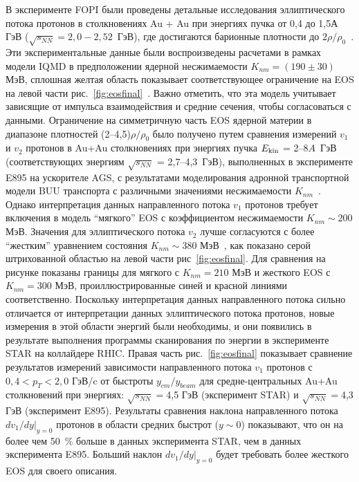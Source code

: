 В эксперименте FOPI были проведены детальные исследования эллиптического потока протонов  в столкновениях Au + Au при энергиях пучка
от 0,4 до 1,5$А$ ГэВ ($\sqrt{s_{NN}} = 2,0 - 2,52$~ГэВ), где достигаются барионные плотности до $2 \rho/\rho_0$~\cite{FOPI:2011aa}.   
Эти экспериментальные данные были воспроизведены расчетами в рамках модели IQMD в предположении ядерной несжимаемости $K_{nm} = (190 \pm 30)$ МэВ, сплошная желтая область показывает соответствующее ограничение на EOS на левой части рис.~\ref{fig:eosfinal}~\cite{sturm2001evidence}. 
Важно отметить, что эта модель учитывает зависящие от импульса взаимодействия и средние сечения, чтобы согласоваться с данными.
Ограничение на симметричную часть EOS ядерной материи  в диапазоне плотностей (2--4,5)$\rho/\rho_{0}$ было получено путем сравнения измерений $v_1$ и $v_2$ протонов в Au+Au столкновениях при энергиях пучка $E_{\rm kin}$ = 2--8$A$~ГэВ (соответствующих энергиям  $\sqrt{s_{NN}}$ = 2,7--4,3~ГэВ), выполненных в эксперименте E895 на ускорителе AGS, с результатами моделирования адронной транспортной модели BUU  транспорта с различными значениями несжимаемости $K_{nm}$~\cite{Danielewicz:2002pu}. 
Однако интерпретация данных направленного потока $v_1$ протонов требует включения в модель ``мягкого'' EOS с коэффициентом несжимаемости $K_{nm} \sim 200$ МэВ. 
Значения  для эллиптического потока $v_2$ лучше согласуются с более ``жестким'' уравнением состояния $K_{nm} \sim 380$ МэВ~\cite{Danielewicz:2002pu}, как показано серой штрихованной областью на левой части рис~\ref{fig:eosfinal}. 
Для сравнения на рисунке  показаны границы для  мягкого с $K_{nm} = 210$ МэВ и жесткого EOS с $K_{nm} = 300$ МэВ, проиллюстрированные синей и красной линиями соответственно.   
Поскольку интерпретация данных направленного потока сильно отличается от интерпретации данных эллиптического потока протонов, новые измерения в этой области энергий  были необходимы, и они появились в результате выполнения программы сканирования по энергии в эксперименте STAR на коллайдере RHIC. 
Правая часть рис.~\ref{fig:eosfinal} показывает сравнение результатов измерений  зависимости направленного потока $v_1$ протонов с $0,4 < p_T < 2,0$ ГэВ/c от быстроты $y_{cm}/y_{beam}$ для средне-центральных Au+Au столкновений при энергиях: $\sqrt{s_{NN}}=$4,5 ГэВ (эксперимент STAR) и $\sqrt{s_{NN}}=$4,3 ГэВ (эксперимент E895).
Результаты сравнения наклона направленного потока $dv_1/dy|_{y=0}$ протонов в области средних быстрот ($y \sim 0$) показывают, что он на более чем 50~\% больше в данных эксперимента STAR, чем в данных эксперимента E895. 
Больший наклон $dv_1/dy|_{y=0}$ будет требовать более жесткого  EOS для своего описания.
